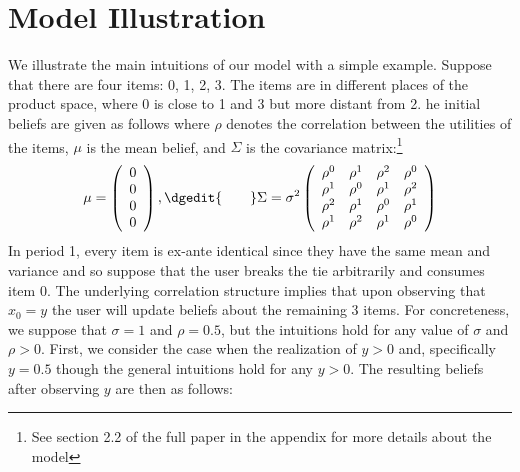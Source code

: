 \documentclass{article}
\begin{document}
\section{Model Illustration}
We illustrate the main intuitions of our model with a simple example. Suppose that there are four items: 0, 1, 2, 3. The items are in different places of the product space, where 0 is close to 1 and 3 but more distant from 2. he initial beliefs are given as follows where $\rho$ denotes the correlation between the utilities of the items, $\mu$ is the mean belief, and $\Sigma$ is the covariance matrix:\footnote{See section 2.2 of the full paper in the appendix for more details about the model}
\[ \mu = \left (\begin{array}{c}
0 \\
0\\
0 \\
0
\end{array}  \right), \\ 
\dgedit{\qquad}\Sigma =  \sigma^{2} \left( \begin{array}{cccc}
\rho^{0} & \rho^{1} & \rho^{2} & \rho^{0} \\
\rho^{1} & \rho^{0} & \rho^{1} & \rho^{2} \\
\rho^{2} & \rho^{1} & \rho^{0} & \rho^{1} \\
\rho^{1} & \rho^{2} & \rho^{1} & \rho^{0} \\
\end{array} \right)
\]
In period 1, every item is ex-ante identical since they have the same mean and variance and so suppose that the user breaks the tie arbitrarily and consumes item 0. The underlying correlation structure implies that upon observing that $x_0 = y$ the user will update beliefs about the remaining 3 items. For concreteness, we suppose that $\sigma = 1$ and $\rho = 0.5$, but the intuitions hold for any value of $\sigma$ and $\rho > 0$. First, we consider the case when the realization of $y > 0$ and, specifically\dgedit{,}  $y = 0.5$\dgedit{ --} though the general intuitions hold for any $y > 0$. The resulting beliefs after observing $y$ are then as follows:
\end{document}
